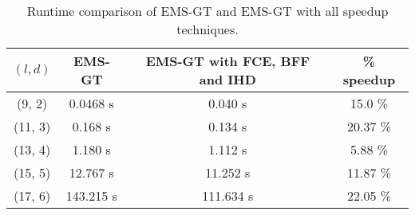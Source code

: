 \begin{table}[h] %
	\renewcommand{\arraystretch}{1.3}
	\centering
	\begin{tabular}{|c|c|c|c|}
	\hline 
	\bfseries\boldmath $(l,d)$ & 
	\bfseries\boldmath EMS-GT & 
	\bfseries\boldmath EMS-GT with FCE, BFF and IHD & 
	\bfseries \% speedup\\
	\hline
	(9, 2) & 0.0468 s &		0.040 s 	&	15.0 \%\\
	(11, 3) & 0.168 s &		0.134 s 	&	20.37 \%\\
	(13, 4) & 1.180 s &		1.112 s 	&	5.88 \%\\
	(15, 5) & 12.767 s &	11.252 s  	&	11.87 \%\\
	(17, 6) & 143.215 s &	111.634 s 	&	22.05 \%\\
	\hline\end{tabular}
	
	\caption{Runtime comparison of EMS-GT and EMS-GT with all speedup techniques.}
	\label{tbl:ems-gt-all-speedup}
\end{table}


